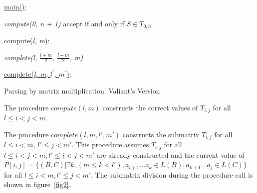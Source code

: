 \begin{algorithm}[h]
\SetAlgoNoLine
{}
\underline{main()}{:}{

 \textit{compute(0, n + 1)\;}
 accept if and only if $S \in T_{0, n}$
 \linebreak
 }

\underline{compute(\textit{l, m})}{:}{

 \textit{complete(l, $\frac{l+m}{2}$, $\frac{l+m}{2}$, m)}
 \linebreak
 }

\underline{complete(\textit{l, m}, $l^\prime$, $m^\prime$)}{:}{

 }
\caption{Parsing by matrix multiplication: Valiant's Version}
\label{algo:valiant}
\end{algorithm}

The procedure $compute(l, m)$ constructs the correct values of $T_{i,j}$ for all $l \le i < j < m$.

The procedure $complete(l, m, l', m')$ constructs the submatrix $T_{i, j}$ for all $l \le i < m$, $l' \le j < m'$. This procedure assumes $T_{i, j}$ for all $l \leq i < j < m,  l' \leq i < j < m'$ are already constructed and the current value of  $P[i, j] =  \{ (B, C) |\exists k, (m \le k < l'), a_{i + 1} \dots a_{k} \in L(B), a_{k + 1} \dots a_{j} \in L(C)\}$ for all $l \leq i < m,  l' \leq j < m'$. The submatrix division during the procedure call is shown in figure~\ref{fig2}.


